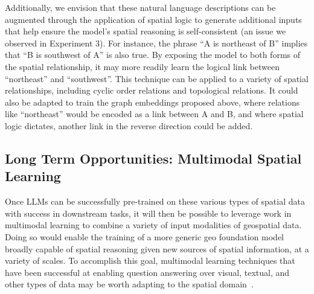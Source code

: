 Additionally, we envision that these natural language descriptions can be augmented through the application of spatial logic to generate additional inputs that help ensure the model's spatial reasoning is self-consistent (an issue we observed in Experiment 3).
For instance, the phrase ``A is northeast of B'' implies that ``B is southwest of A'' is also true.
By exposing the model to both forms of the spatial relationship, it may more readily learn the logical link between ``northeast'' and ``southwest''.
This technique can be applied to a variety of spatial relationships, including cyclic order relations and topological relations.
It could also be adapted to train the graph embeddings proposed above, where relations like ``northeast'' would be encoded as a link between A and B, and where spatial logic dictates, another link in the reverse direction could be added.






\subsection{Long Term Opportunities: Multimodal Spatial Learning}
Once LLMs can be successfully pre-trained on these various types of spatial data with success in downstream tasks, it will then be possible to leverage work in multimodal learning to combine a variety of input modalities of geospatial data.
Doing so would enable the training of a more generic geo foundation model broadly capable of spatial reasoning given new sources of spatial information, at a variety of scales.
To accomplish this goal, multimodal learning techniques that have been successful at enabling question answering over visual, textual, and other types of data may be worth adapting to the spatial domain~\cite{Fei2022}.

